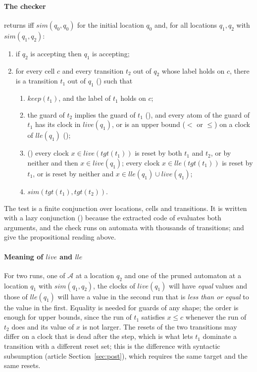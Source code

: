 \paragraph{The checker}  returns  iff $\mathit{sim}(q_0,q_0)$ for the initial location $q_0$ and, for all locations $q_1,q_2$ with $\mathit{sim}(q_1,q_2)$:
\begin{enumerate}[label=(P\arabic*),leftmargin=*,itemsep=0pt]
  \item if $q_2$ is accepting then $q_1$ is accepting;
  \item for every cell $c$ and every transition $t_2$ out of $q_2$ whose label holds on $c$, there is a transition $t_1$ out of $q_1$ () such that
  \begin{enumerate}[label=(\alph*),itemsep=0pt]
    \item $\mathit{keep}(t_1)$, and the label of $t_1$ holds on $c$;
    \item the guard of $t_2$ implies the guard of $t_1$ (), and every atom of the guard of $t_1$ has its clock in $\mathit{live}(q_1)$, or is an upper bound ($<$ or $\le$) on a clock of $\mathit{lle}(q_1)$ ();
    \item () every clock $x\in\mathit{live}(\mathit{tgt}(t_1))$ is reset by both $t_1$ and $t_2$, or by neither and then $x\in\mathit{live}(q_1)$; every clock $x\in\mathit{lle}(\mathit{tgt}(t_1))$ is reset by $t_1$, or is reset by neither and $x\in\mathit{lle}(q_1)\cup\mathit{live}(q_1)$;
    \item $\mathit{sim}(\mathit{tgt}(t_1),\mathit{tgt}(t_2))$.
  \end{enumerate}
\end{enumerate}
The test is a finite conjunction over locations, cells and transitions. It is written with a lazy conjunction () because the extracted code of  evaluates both arguments, and the check runs on automata with thousands of transitions;  and  give the propositional reading above.

\paragraph{Meaning of $\mathit{live}$ and $\mathit{lle}$} For two runs, one of $\mathcal A$ at a location $q_2$ and one of the pruned automaton at a location $q_1$ with $\mathit{sim}(q_1,q_2)$, the clocks of $\mathit{live}(q_1)$ will have \emph{equal} values and those of $\mathit{lle}(q_1)$ will have a value in the second run that is \emph{less than or equal} to the value in the first. Equality is needed for guards of any shape; the order is enough for upper bounds, since the run of $t_1$ satisfies $x\le c$ whenever the run of $t_2$ does and its value of $x$ is not larger. The resets of the two transitions may differ on a clock that is dead after the step, which is what lets $t_1$ dominate a transition with a different reset set; this is the difference with syntactic subsumption (article Section~\ref{sec:post}), which requires the same target and the same resets.

